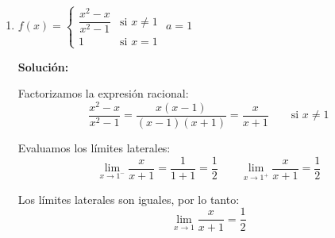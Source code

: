 \documentclass[12pt]{article}
\newcommand{\solucion}{%
    \vspace{0.8em}%
    \textbf{Solución:}%
}
\begin{document}
\begin{enumerate}[label=\alph*)]
    \solucion

    Evaluamos $h(0)$:
    \[
    h(0) = 0^2 = 0
    \]

    Evaluamos los límites laterales en el punto $a = 0$:
    \[
    \lim_{x \to 0^-} \left(e^x\right) = e^0 = 1 \qquad \lim_{x \to 0^+} \left(x^2\right) = 0^2 = 0
    \]

    Como $\displaystyle\lim_{x \to 0^-} h(x) \neq \lim_{x \to 0^+} h(x)$, el límite $\displaystyle\lim_{x \to 0} h(x)$ no existe.

    La función está definida en $x = 0$ pero el límite no existe, por lo tanto $h(x)$ es discontinua \textbf{no evitable de salto finito}.

    \begin{center}
    \end{center}

    \newpage
    \item $f(x) = \begin{cases} \dfrac{x^2 - x}{x^2 - 1} & \text{si } x \neq 1 \\ 1 & \text{si } x = 1 \end{cases}$ \quad $a = 1$

    \solucion

    Factorizamos la expresión racional:
    \[
    \frac{x^2 - x}{x^2 - 1} = \frac{x(x-1)}{(x-1)(x+1)} = \frac{x}{x+1} \qquad \text{si } x \neq 1
    \]

    Evaluamos los límites laterales:
    \[
    \lim_{x \to 1^-} \frac{x}{x+1} = \frac{1}{1+1} = \frac{1}{2} \qquad \lim_{x \to 1^+} \frac{x}{x+1} = \frac{1}{2}
    \]

    Los límites laterales son iguales, por lo tanto:
    \[
    \lim_{x \to 1} \frac{x}{x+1} = \frac{1}{2}
    \]


\end{enumerate}
\end{document}
